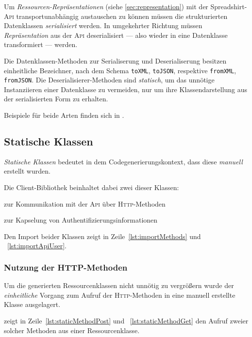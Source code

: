 Um \emph{Ressourcen-Repräsentationen} (siehe \cref{sec:representation}) mit der Spreadshirt-\textsc{Api} transportunabhängig austauschen zu können müssen die strukturierten Datenklassen \emph{serialisiert} werden. In umgekehrter Richtung müssen \emph{Repräsentation} aus der \textsc{Api} deserialisiert --- also wieder in eine Datenklasse transformiert --- werden.

Die Datenklassen-Methoden zur Serialiserung und Deserialiserung besitzen einheitliche Bezeichner, nach dem Schema \texttt{toXML}, \texttt{toJSON}, respektive \texttt{fromXML}, \texttt{fromJSON}. Die Deserialisierer-Methoden sind \emph{statisch}, um das unnötige Instanziieren einer Datenklasse zu vermeiden, nur um ihre Klassendarstellung aus der serialisierten Form zu erhalten.

Beispiele für beide Arten finden sich in .

\subsection{Statische Klassen}
\label{sec:static_classes}

\emph{Statische Klassen} bedeutet in dem Codegenerierungskontext, dass diese \emph{manuell} erstellt wurden. 

Die Client-Bibliothek beinhaltet dabei zwei dieser Klassen:
\begin{compactenum}
    \item zur Kommunikation mit der \textsc{Api} über \textsc{Http}-Methoden
    \item zur Kapselung von Authentifizierungsinformationen
\end{compactenum}

Den Import beider Klassen zeigt  in Zeile~\ref{lst:importMethods} und ~\ref{lst:importApiUser}.

\subsubsection{Nutzung der HTTP-Methoden}
\label{sec:staticMethodsClass}

Um die generierten Ressourcenklassen nicht unnötig zu vergrößern wurde der \emph{einheitliche} Vorgang zum Aufruf der \textsc{Http}-Methoden in eine manuell erstellte Klasse ausgelagert.

 zeigt in Zeile~\ref{lst:staticMethodPost} und ~\ref{lst:staticMethodGet} den Aufruf zweier solcher Methoden aus einer Ressourcenklasse.

